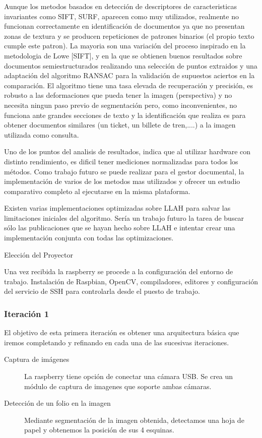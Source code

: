 Aunque los metodos basados en detección de descriptores de caracteristicas invariantes como SIFT, SURF, aparecen como muy utilizados, realmente no funcionan correctamente en identificación de documentos ya que no presentan zonas de textura y se producen repeticiones de patrones binarios (el propio texto cumple este patron). La mayoria son una variación del proceso inspirado en la metodologia de Lowe [SIFT], y en la que se obtienen buenos resultados sobre documentos semiestructurados realizando una selección de puntos extraidos y una adaptación del algoritmo RANSAC para la validación de supuestos aciertos en la comparación. El algoritmo tiene una tasa elevada de recuperación y precisión, es robusto a las deformaciones que pueda tener la imagen (perspectiva) y no necesita ningun paso previo de segmentación pero, como inconvenientes, no funciona ante grandes secciones de texto y la identificación que realiza es para obtener documentos similares (un ticket, un billete de tren,....) a la imagen utilizada como consulta.

Uno de los puntos del analisis de resultados, indica que al utilizar hardware con distinto rendimiento, es dificil tener mediciones normalizadas para todos los métodos. Como trabajo futuro se puede realizar para el gestor documental, la implementación de varios de los metodos mas utilizados y ofrecer un estudio comparativo completo al ejecutarse en la misma plataforma.

Existen varias implementaciones optimizadas sobre LLAH para salvar las limitaciones iniciales del algoritmo. Sería un trabajo futuro la tarea de buscar sólo las publicaciones que se hayan hecho sobre LLAH e intentar crear una implementación conjunta  con todas las optimizaciones. 

Elección del Proyector

Una vez recibida la raspberry se procede a la configuración del entorno de trabajo. Instalación de Raspbian, OpenCV, compiladores, editores y configuración del servicio de SSH para controlarla desde el puesto de trabajo.

\subsubsection{Iteración 1}
El objetivo de esta primera iteración es obtener una arquitectura básica que iremos completando y refinando en cada una de las sucesivas iteraciones.

\begin{description}
\item [Captura de imágenes] La raspberry tiene opción de conectar una cámara USB. Se crea un módulo de captura de imagenes que soporte ambas cámaras.
\item [Detección de un folio en la imagen] Mediante segmentación de la imagen obtenida, detectamos una hoja de papel y obtenemos la posición de sus 4 esquinas.
\end{description}

